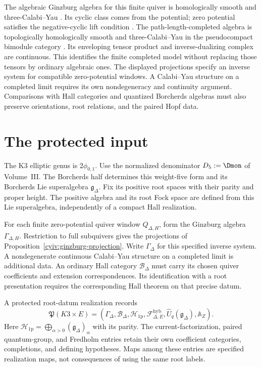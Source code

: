 The algebraic Ginzburg algebra for this finite quiver is homologically
smooth and three-Calabi--Yau \cite[Theorem~6.3]{KellerCY}. Its cyclic
class comes from the potential; zero potential satisfies the
negative-cyclic lift condition \cite{KellerCYErratum}.
The path-length-completed algebra is topologically homologically
smooth and three-Calabi--Yau in the pseudocompact bimodule category
\cite[Theorem~A.17]{KellerYang}. Its enveloping tensor product and
inverse-dualizing complex are continuous. This identifies the
finite completed model without replacing those tensors by ordinary
algebraic ones.
The displayed projections specify an inverse system for compatible
zero-potential windows.
A Calabi--Yau structure on a completed limit requires its own
nondegeneracy and continuity argument.
Comparisons with Hall categories and quantized Borcherds algebras must
also preserve orientations, root relations, and the paired Hopf data.

\section{The protected input}
The K3 elliptic genus is $2\phi_{0,1}$.
Use the normalized denominator $D_5:=\Dmon$ of Volume~III. The Borcherds half determines this weight-five form and its
Borcherds Lie superalgebra $\mathfrak g_\Delta$.
Fix its positive root spaces with their parity and proper height.
The positive algebra and its root Fock space are defined from this Lie
superalgebra, independently of a compact Hall realization.

For each finite zero-potential quiver window $Q_{\Delta,H}$, form the
Ginzburg algebra $\Gamma_{\Delta,H}$.
Restriction to full subquivers gives the projections of
Proposition~\ref{cyiv:ginzburg-projection}.
Write $\Gamma_\Delta$ for this specified inverse system.
A nondegenerate continuous Calabi--Yau structure on a completed limit
is additional data.
An ordinary Hall category $\mathcal B_\Delta$ must carry its chosen
quiver coefficients and extension correspondences.
Its identification with a root presentation requires the corresponding
Hall theorem on that precise datum.

\begin{definition}
A protected root-datum realization records
\[
 \mathfrak P(K3\times E)=
 (\Gamma_\Delta,\mathcal B_\Delta,\mathcal H_{\mathrm{1p}},
 \mathcal F^{\mathrm{hyb}}_{\Delta,E},\widehat U_q(\mathfrak g_\Delta),
 \mathbb A_Z).
\]
Here $\mathcal H_{\mathrm{1p}}=\bigoplus_{\alpha>0}(\mathfrak g_\Delta)_\alpha$
with its parity.
The current-factorization, paired quantum-group, and Fredholm entries
retain their own coefficient categories, completions, and defining
hypotheses.
Maps among these entries are specified realization maps, not consequences
of using the same root labels.
\end{definition}

